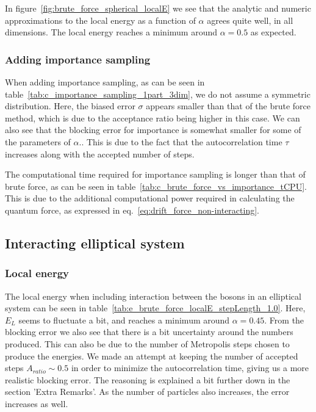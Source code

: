 \documentclass[
    a4paper, aps, twocolumn, floatfix, superscriptaddress,
    nofootinbib]{revtex4-1}
\begin{document}
In figure~\ref{fig:brute_force_spherical_localE} we see that the analytic and numeric approximations to the local energy as a function of $\alpha$ agrees quite well, in all dimensions. The local energy reaches a minimum around $\alpha = 0.5$ as expected.

\subsubsection{Adding importance sampling}
When adding importance sampling, as can be seen in table~\ref{tab:c_importance_sampling_1part_3dim}, we do not assume a symmetric distribution. Here, the biased error $\sigma$ appears smaller than that of the brute force method, which is due to the acceptance ratio being higher in this case. We can also see that the blocking error for importance is somewhat smaller for some of the parameters of $\alpha$.. This is due to the fact that the autocorrelation time $\tau$ increases along with the accepted number of steps.


The computational time required for importance sampling is longer than that of brute force, as can be seen in table~\ref{tab:c_brute_force_vs_importance_tCPU}. This is due to the additional computational power required in calculating the quantum force, as expressed in eq.~\eqref{eq:drift_force_non-interacting}.

\subsection{Interacting elliptical system}
\subsubsection{Local energy}
The local energy when including interaction between the bosons in an elliptical system can be seen in table~\ref{tab:e_brute_force_localE_stepLength_1.0}. Here, $E_L$ seems to fluctuate a bit, and reaches a minimum around $\alpha = 0.45$. From the blocking error we also see that there is a bit uncertainty around the numbers produced. This can also be due to the number of Metropolis steps chosen to produce the energies. We made an attempt at keeping the number of accepted steps $A_{ratio}\sim 0.5$ in order to minimize the autocorrelation time, giving us a more realistic blocking error. The reasoning is explained a bit further down in the section 'Extra Remarks'. As the number of particles also increases, the error increases as well.
\end{document}
